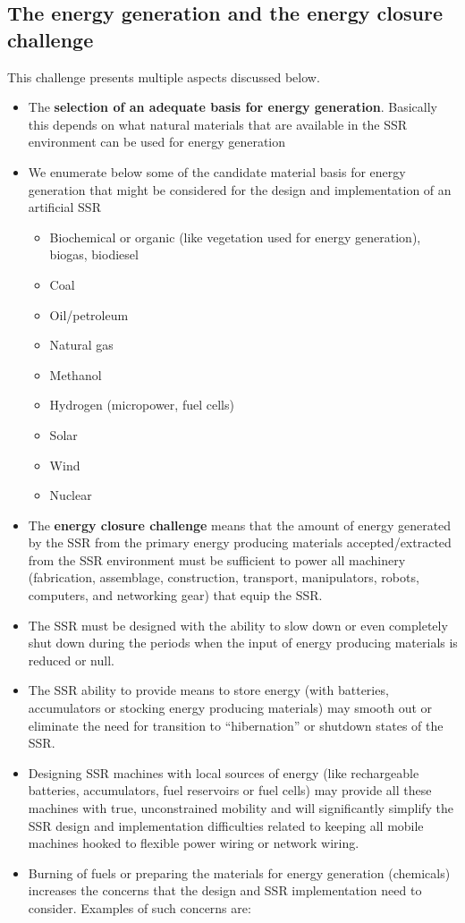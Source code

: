\documentclass[letterpaper]{article}
\begin{document}
\bigskip

\subsection[The energy generation and the energy closure challenge]{The
energy generation and the energy closure challenge}
\hypertarget{RefHeading3138306210128}{}This challenge presents multiple
aspects discussed below.


\bigskip

\begin{itemize}
\item The \textbf{selection of an adequate basis for energy generation}.
Basically this depends on what natural materials that are available in
the SSR environment can be used for energy generation
\item We enumerate below some of the candidate material basis for energy
generation that might be considered for the design and implementation
of an artificial SSR

\begin{itemize}
\item Biochemical or organic (like vegetation used for energy
generation), biogas, biodiesel
\item Coal
\item Oil/petroleum
\item Natural gas
\item Methanol
\item Hydrogen (micropower, fuel cells)
\item Solar
\item Wind
\item Nuclear
\end{itemize}
\item The \textbf{energy closure challenge} means that the amount of
energy generated by the SSR from the primary energy producing materials
accepted/extracted from the SSR environment must be sufficient to power
all machinery (fabrication, assemblage, construction, transport,
manipulators, robots, computers, and networking gear) that equip the
SSR.
\item The SSR must be designed with the ability to slow down or even
completely shut down during the periods when the input of energy
producing materials is reduced or null.
\item The SSR ability to provide means to store energy (with batteries,
accumulators or stocking energy producing materials) may smooth out or
eliminate the need for transition to “hibernation” or shutdown states
of the SSR.
\item Designing SSR machines with local sources of energy (like
rechargeable batteries, accumulators, fuel reservoirs or fuel cells)
may provide all these machines with true, unconstrained mobility and
will significantly simplify the SSR design and implementation
difficulties related to keeping all mobile machines hooked to flexible
power wiring or network wiring.
\item Burning of fuels or preparing the materials for energy generation
(chemicals) increases the concerns that the design and SSR
implementation need to consider. Examples of such concerns are: 


\end{itemize}
\end{document}
